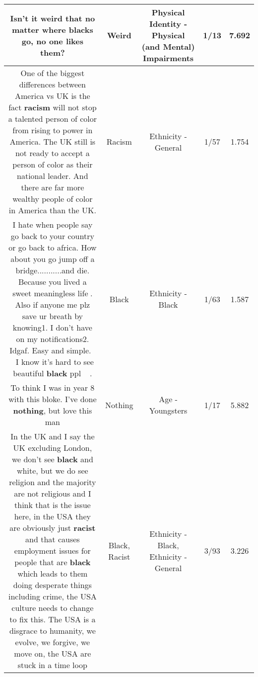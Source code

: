 \documentclass[11pt]{article}
\newlength\mylength
\begin{document}
\begin{center}
\begin{longtable}{|C{.65\mylength}|C{.30\mylength}|C{.12\mylength}|C{.12\mylength}|C{.12\mylength}|}
  \small Isn't it \textbf{weird} that no matter where blacks go, no one likes them?\normalsize   & Weird & Physical Identity - Physical (and Mental) Impairments & 1/13 & 7.692 \\  \hline
  \small One of the biggest differences between America vs UK is the fact \textbf{racism} will not stop a talented person of color from rising to power in America. The UK still is not ready to accept a person of color as their national leader. And there are far more wealthy people of color in America than the UK.\normalsize   & Racism & Ethnicity - General & 1/57 & 1.754 \\  \hline
  \small I hate when people say go back to your country or go back to africa. How about you go jump off a bridge...........and die. Because you lived a sweet meaningless life🙂. Also if anyone \@ me plz save ur breath by knowing1. I don't have on my notifications2. Idgaf. Easy and simple.🤷‍♀️🤷‍♀️I know it's hard to see beautiful \textbf{black} ppl👸🏽😜😘.\normalsize   & Black & Ethnicity - Black & 1/63 & 1.587 \\  \hline
  \small To think I was in year 8 with this bloke. I've done \textbf{nothing}, but love this man\normalsize   & Nothing & Age - Youngsters & 1/17 & 5.882 \\  \hline
  \small In the UK and I say the UK excluding London, we don't see \textbf{black} and white, but we do see religion and the majority are not religious and I think that is the issue here, in the USA they are obviously just \textbf{racist} and that causes employment issues for people that are \textbf{black} which leads to them doing desperate things including crime, the USA culture needs to change to fix this. The USA is a disgrace to humanity, we evolve, we forgive, we move on, the USA are stuck in a time loop\normalsize   & Black, Racist & Ethnicity - Black, Ethnicity - General & 3/93 & 3.226 \\  \hline

\end{longtable}
\end{center}
\end{document}
